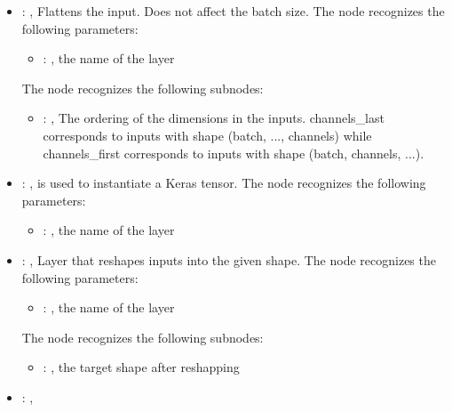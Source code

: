 \begin{itemize}
    \item {}: , 
      Flattens the input. Does not affect the batch size.
      The  node recognizes the following parameters:
        \begin{itemize}
          \item {}: , 
            the name of the layer
      \end{itemize}

      The  node recognizes the following subnodes:
      \begin{itemize}
        \item {}: , 
          The ordering of the dimensions in the inputs. channels\_last corresponds to inputs with
          shape         (batch, ..., channels) while channels\_first corresponds to inputs with shape
          (batch, channels, ...).
      \end{itemize}

    \item {}: , 
      is used to instantiate a Keras tensor.
      The  node recognizes the following parameters:
        \begin{itemize}
          \item {}: , 
            the name of the layer
      \end{itemize}

    \item {}: , 
      Layer that reshapes inputs into the given shape.
      The  node recognizes the following parameters:
        \begin{itemize}
          \item {}: , 
            the name of the layer
      \end{itemize}

      The  node recognizes the following subnodes:
      \begin{itemize}
        \item {}: , 
          the target shape after reshapping
      \end{itemize}

    \item {}: , 


\end{itemize}
